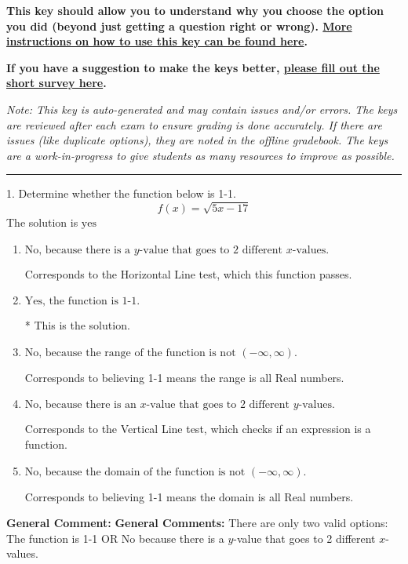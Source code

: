\documentclass{extbook}[14pt]
\begin{document}
\textbf{This key should allow you to understand why you choose the option you did (beyond just getting a question right or wrong). \href{https://xronos.clas.ufl.edu/mac1105spring2020/courseDescriptionAndMisc/Exams/LearningFromResults}{More instructions on how to use this key can be found here}.}

\textbf{If you have a suggestion to make the keys better, \href{https://forms.gle/CZkbZmPbC9XALEE88}{please fill out the short survey here}.}

\textit{Note: This key is auto-generated and may contain issues and/or errors. The keys are reviewed after each exam to ensure grading is done accurately. If there are issues (like duplicate options), they are noted in the offline gradebook. The keys are a work-in-progress to give students as many resources to improve as possible.}

\rule{\textwidth}{0.4pt}

1. Determine whether the function below is 1-1.
\[ f(x) = \sqrt{5 x - 17} \] 
The solution is $ \text{yes} $ 

\begin{enumerate}[label=\Alph*.] 
\item $ \text{No, because there is a $y$-value that goes to 2 different $x$-values.} $ 

 Corresponds to the Horizontal Line test, which this function passes. 
\item $ \text{Yes, the function is 1-1.} $ 

 * This is the solution. 
\item $ \text{No, because the range of the function is not $(-\infty, \infty)$.} $ 

 Corresponds to believing 1-1 means the range is all Real numbers. 
\item $ \text{No, because there is an $x$-value that goes to 2 different $y$-values.} $ 

 Corresponds to the Vertical Line test, which checks if an expression is a function. 
\item $ \text{No, because the domain of the function is not $(-\infty, \infty)$.} $ 

 Corresponds to believing 1-1 means the domain is all Real numbers. 
\end{enumerate} 
 
\textbf{General Comment:} \textbf{General Comments:} There are only two valid options: The function is 1-1 OR No because there is a $y$-value that goes to 2 different $x$-values. 
\end{document}
